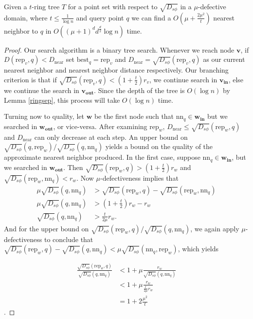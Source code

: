 \documentclass[11pt]{myclass}
\newcommand{\sbreg}{\ensuremath{D_{s\phi}}}
\begin{document}
\begin{lemma}\label{ringsearch}
Given a $t$-ring tree $T$ for a point set with respect to $\sqrt{\sbreg}$ in a $\mu$-defective domain, where $t \leq \frac{1}{\log n}$ 
and query point $q$ we can find a $O(\mu + \frac{2 \mu^2 }{t})$ nearest neighbor to $q$ in $O( (\mu+1)^d d^{\frac{d}{2}} \log n)$ time.
\end{lemma}
\begin{proof}
Our search algorithm is a binary tree search. Whenever we reach node $\textbf{v}$, 
if $D(\text{rep}_v,q) < D_{\text{near}}$ set $\text{best}_q =\text{rep}_v$ and $D_{\text{near}} = \sqrt{\sbreg}(\text{rep}_v,q)$ 
as our current nearest neighbor and nearest neighbor distance respectively.
Our branching criterion is that if  $\sqrt{\sbreg}(\text{rep}_v, q) < (1 + \frac{t}{2}) r_v$,
 we continue search in $\mathbf{v_{\text{in}}}$, else we continue the  search in $\mathbf{v_{\text{out}}}$.
 Since the depth of the tree is $O(\log n)$ by Lemma \ref{ringsep}, this process will take $O(\log n)$ time.

Turning now to quality, let $\textbf{w}$ be the first node such that $\text{nn}_q \in \mathbf{w_{\text{in}}}$ but we 
searched in $\mathbf{w_{\text{out}}}$, or vice-versa.  After examining $\text{rep}_w$, $D_{\text{near}} \leq \sqrt{\sbreg}(\text{rep}_w, q)$ and $D_{\text{near}}$ can only decrease at each step.
 An upper bound on $\sqrt{\sbreg}(q, \text{rep}_w)/\sqrt{\sbreg}(q,\text{nn}_q)$ yields a bound on the quality of the approximate nearest neighbor produced.
In the first case, suppose $\text{nn}_q \in \mathbf{w_{\text{in}}}$, but we searched in $\mathbf{w_{\text{out}}}$.
Then $\sqrt{\sbreg}(\text{rep}_w, q) > \left( 1 + \frac{t}{2} \right) r_w$ and  $\sqrt{\sbreg}(\text{rep}_w, \text{nn}_q) < r_w$.
Now $\mu$-defectiveness implies that 
\begin{align*}
\mu \sqrt{\sbreg}(q,\text{nn}_q) &> \sqrt{\sbreg} (\text{rep}_w, q) - \sqrt{\sbreg}(\text{rep}_w, \text{nn}_q)  \\ 
\mu \sqrt{\sbreg}(q,\text{nn}_q) &> \left( 1+ \frac{t}{2} \right) r_w - r_w  \\
\sqrt{\sbreg}(q,\text{nn}_q) &>  \frac{t}{2 \mu} r_w.
\end{align*}
And for the upper bound on $\sqrt{\sbreg}(\text{rep}_w,q)/\sqrt{\sbreg}(q,\text{nn}_q)$, we again apply $\mu$-defectiveness to conclude that $\sqrt{\sbreg}(\text{rep}_w,q) - \sqrt{\sbreg}(q, \text{nn}_q) < \mu \sqrt{\sbreg}(\text{nn}_q, \text{rep}_w)$, which yields 

\begin{align*}
\frac{\sqrt{\sbreg}(\text{rep}_w,q)}{\sqrt{\sbreg}(q,\text{nn}_q)} &< 1 + \mu  \frac{r_w}{\sqrt{\sbreg}(q, \text{nn}_q)} \\ 
&< 1 + \mu \frac{r_w}{\frac{t}{2 \mu}r_w} \\
& = 1 + 2 \frac{\mu^2}{t}
\end{align*}.



\end{proof}
\end{document}
